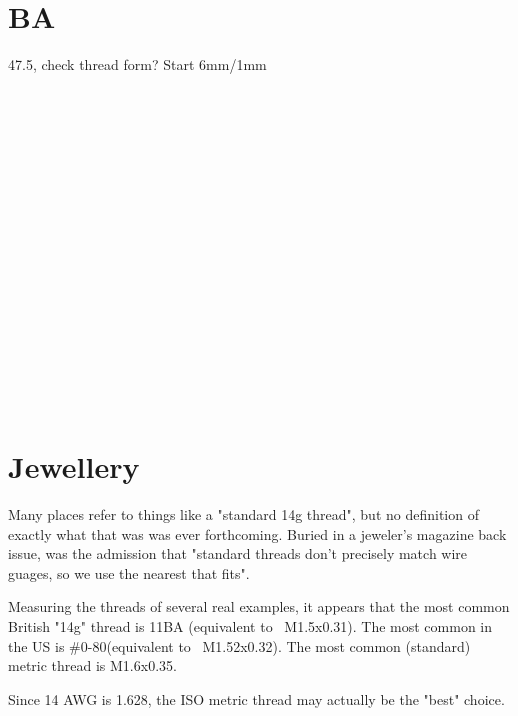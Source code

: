 \section{BA}
47.5\degree, check thread form?
Start 
6mm/1mm
\\ \\ \\ \\ \\ \\ \\ \\ \\ \\ \\ \\ \\ \\ \\ \\ \\ \\               
                                                                                                                   
\clearpage
\section{Jewellery}
Many places refer to things like a "standard 14g thread", but no definition of exactly what that was was ever forthcoming.  Buried in a jeweler's magazine back issue, was the admission that "standard threads don't precisely match wire guages, so we use the nearest that fits".  

Measuring the threads of several real examples, it appears that the most common British "14g" thread is 11BA (equivalent to ~M1.5x0.31).  The most common in the US is \#0-80(equivalent to ~M1.52x0.32).  The most common (standard) metric thread is M1.6x0.35.

Since 14 AWG is 1.628, the ISO metric thread may actually be the "best" choice.

